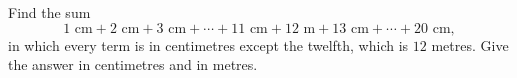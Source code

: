 Find the sum
\[
1\text{ cm}+2\text{ cm}+3\text{ cm}+\cdots+11\text{ cm}+12\text{ m}+13\text{ cm}+\cdots+20\text{ cm},
\]
in which every term is in centimetres except the twelfth, which is $12$ metres. Give the answer in centimetres and in metres.
